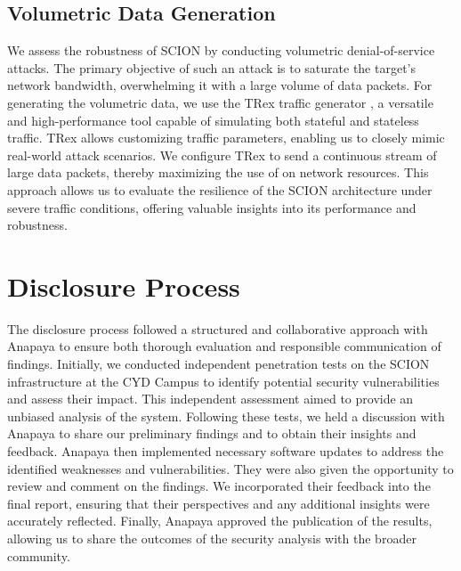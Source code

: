 \newpage

\subsection{Volumetric Data Generation}
We assess the robustness of SCION by conducting volumetric denial-of-service attacks.
The primary objective of such an attack is to saturate the target's network bandwidth, overwhelming it with a large volume of data packets.
For generating the volumetric data, we use the TRex traffic generator \cite{trexWebsite}, a versatile and high-performance tool capable of simulating both stateful and stateless traffic.
TRex allows customizing traffic parameters, enabling us to closely mimic real-world attack scenarios.
We configure TRex to send a continuous stream of large data packets, thereby maximizing the use of on network resources.
This approach allows us to evaluate the resilience of the SCION architecture under severe traffic conditions, offering valuable insights into its performance and robustness.

\section{Disclosure Process}
\label{sec:methodology:disclosure}

The disclosure process followed a structured and collaborative approach with Anapaya to ensure both thorough evaluation and responsible communication of findings.
Initially, we conducted independent penetration tests on the SCION infrastructure at the CYD Campus to identify potential security vulnerabilities and assess their impact.
This independent assessment aimed to provide an unbiased analysis of the system.
Following these tests, we held a discussion with Anapaya to share our preliminary findings and to obtain their insights and feedback.
Anapaya then implemented necessary software updates to address the identified weaknesses and vulnerabilities.
They were also given the opportunity to review and comment on the findings.
We incorporated their feedback into the final report, ensuring that their perspectives and any additional insights were accurately reflected.
Finally, Anapaya approved the publication of the results, allowing us to share the outcomes of the security analysis with the broader community.

